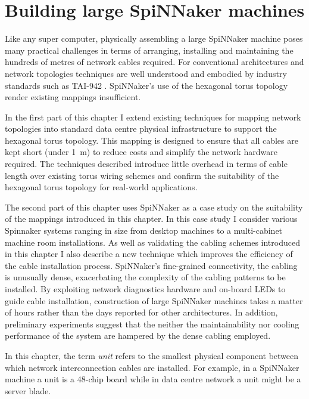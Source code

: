\chapter{Building large SpiNNaker machines}
	
	\label{sec:building}
	
	Like any super computer, physically assembling a large SpiNNaker machine
	poses many practical challenges in terms of arranging, installing and
	maintaining the hundreds of metres of network cables required.  For
	conventional architectures and network topologies techniques are well
	understood and embodied by industry standards such as TAI-942 \cite{tia2006}.
	SpiNNaker's use of the hexagonal torus topology render existing mappings
	insufficient.
	
	In the first part of this chapter I extend existing techniques for mapping
	network topologies into standard data centre physical infrastructure to
	support the hexagonal torus topology. This mapping is designed to ensure that
	all cables are kept short (under \SI{1}{\meter}) to reduce costs and
	simplify the network hardware required. The techniques described introduce
	little overhead in terms of cable length over existing torus wiring schemes
	and confirm the suitability of the hexagonal torus topology for real-world
	applications.
	
	The second part of this chapter uses SpiNNaker as a case study on the
	suitability of the mappings introduced in this chapter.  In this case study I
	consider various Spinnaker systems ranging in size from desktop machines to a
	multi-cabinet machine room installations. As well as validating the cabling
	schemes introduced in this chapter I also describe a new technique which
	improves the efficiency of the cable installation process.  SpiNNaker's
	fine-grained connectivity, the cabling is unusually dense, exacerbating the
	complexity of the cabling patterns to be installed. By exploiting network
	diagnostics hardware and on-board LEDs to guide cable installation,
	construction of large SpiNNaker machines takes a matter of hours rather than
	the days reported for other architectures. In addition, preliminary
	experiments suggest that the neither the maintainability nor cooling
	performance of the system are hampered by the dense cabling employed.
	
	In this chapter, the term \emph{unit} refers to the smallest physical
	component between which network interconnection cables are installed. For
	example, in a SpiNNaker machine a unit is a 48-chip board while in data
	centre network a unit might be a server blade.
	
